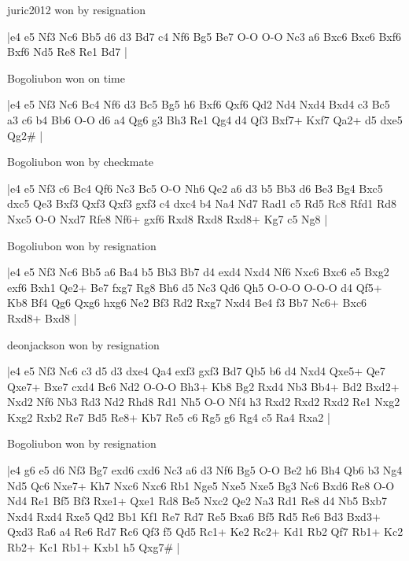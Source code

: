 \showboard

juric2012 won by resignation

\makegametitle
|e4 e5 Nf3 Nc6 Bb5 d6 d3 Bd7 c4 Nf6 Bg5 Be7 O-O O-O Nc3 a6 Bxc6 Bxc6 Bxf6 Bxf6 Nd5 Re8 Re1 Bd7  |

\showboard

Bogoliubon won on time

\makegametitle
|e4 e5 Nf3 Nc6 Bc4 Nf6 d3 Bc5 Bg5 h6 Bxf6 Qxf6 Qd2 Nd4 Nxd4 Bxd4 c3 Bc5 a3 c6 b4 Bb6 O-O d6 a4 Qg6 g3 Bh3 Re1 Qg4 d4 Qf3 Bxf7+ Kxf7 Qa2+ d5 dxe5 Qg2\#  |

\showboard

Bogoliubon won by checkmate

\makegametitle
|e4 e5 Nf3 c6 Bc4 Qf6 Nc3 Bc5 O-O Nh6 Qe2 a6 d3 b5 Bb3 d6 Be3 Bg4 Bxc5 dxc5 Qe3 Bxf3 Qxf3 Qxf3 gxf3 c4 dxc4 b4 Na4 Nd7 Rad1 c5 Rd5 Rc8 Rfd1 Rd8 Nxc5 O-O Nxd7 Rfe8 Nf6+ gxf6 Rxd8 Rxd8 Rxd8+ Kg7 c5 Ng8  |

\showboard

Bogoliubon won by resignation

\makegametitle
|e4 e5 Nf3 Nc6 Bb5 a6 Ba4 b5 Bb3 Bb7 d4 exd4 Nxd4 Nf6 Nxc6 Bxc6 e5 Bxg2 exf6 Bxh1 Qe2+ Be7 fxg7 Rg8 Bh6 d5 Nc3 Qd6 Qh5 O-O-O O-O-O d4 Qf5+ Kb8 Bf4 Qg6 Qxg6 hxg6 Ne2 Bf3 Rd2 Rxg7 Nxd4 Be4 f3 Bb7 Nc6+ Bxc6 Rxd8+ Bxd8  |

\showboard

deonjackson won by resignation

\makegametitle
|e4 e5 Nf3 Nc6 c3 d5 d3 dxe4 Qa4 exf3 gxf3 Bd7 Qb5 b6 d4 Nxd4 Qxe5+ Qe7 Qxe7+ Bxe7 cxd4 Bc6 Nd2 O-O-O Bh3+ Kb8 Bg2 Rxd4 Nb3 Bb4+ Bd2 Bxd2+ Nxd2 Nf6 Nb3 Rd3 Nd2 Rhd8 Rd1 Nh5 O-O Nf4 h3 Rxd2 Rxd2 Rxd2 Re1 Nxg2 Kxg2 Rxb2 Re7 Bd5 Re8+ Kb7 Re5 c6 Rg5 g6 Rg4 c5 Ra4 Rxa2  |

\showboard

Bogoliubon won by resignation

\makegametitle
|e4 g6 e5 d6 Nf3 Bg7 exd6 cxd6 Nc3 a6 d3 Nf6 Bg5 O-O Be2 h6 Bh4 Qb6 b3 Ng4 Nd5 Qc6 Nxe7+ Kh7 Nxc6 Nxc6 Rb1 Nge5 Nxe5 Nxe5 Bg3 Nc6 Bxd6 Re8 O-O Nd4 Re1 Bf5 Bf3 Rxe1+ Qxe1 Rd8 Be5 Nxc2 Qe2 Na3 Rd1 Re8 d4 Nb5 Bxb7 Nxd4 Rxd4 Rxe5 Qd2 Bb1 Kf1 Re7 Rd7 Re5 Bxa6 Bf5 Rd5 Re6 Bd3 Bxd3+ Qxd3 Ra6 a4 Re6 Rd7 Rc6 Qf3 f5 Qd5 Rc1+ Ke2 Rc2+ Kd1 Rb2 Qf7 Rb1+ Kc2 Rb2+ Kc1 Rb1+ Kxb1 h5 Qxg7\#  |

